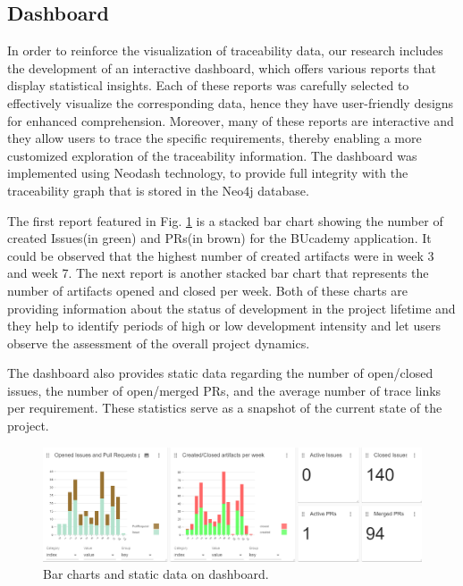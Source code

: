 \subsection{Dashboard}
\label{sec:dboard}


In order to reinforce the visualization of traceability data, our research includes the development of an interactive dashboard, which offers various reports that display statistical insights. Each of these reports was carefully selected to effectively visualize the corresponding data, hence they have user-friendly designs for enhanced comprehension. Moreover, many of these reports are interactive and they allow users to trace the specific requirements, thereby enabling a more customized exploration of the traceability information.
The dashboard was implemented using Neodash technology, to provide full integrity with the traceability graph that is stored in the Neo4j database.

The first report featured in Fig. \ref{fig:barcharts} is a stacked bar chart showing the number of created Issues(in green) and PRs(in brown) for the BUcademy application. It could be observed that the highest number of created artifacts were in week 3 and week 7. The next report is another stacked bar chart that represents the number of artifacts opened and closed per week. Both of these charts are providing information about the status of development in the project lifetime and they help to identify periods of high or low development intensity and let users observe the assessment of the overall project dynamics.

The dashboard also provides static data regarding the number of open/closed issues, the number of open/merged PRs, and the average number of trace links per requirement. These statistics serve as a snapshot of the current state of the project.

\begin{figure}[htb]
    \centering
    \includegraphics[width=0.9\linewidth]{figs/dashboard-barcharts.png}
    \caption{Bar charts and static data on dashboard.}
    \label{fig:barcharts}
\end{figure}

